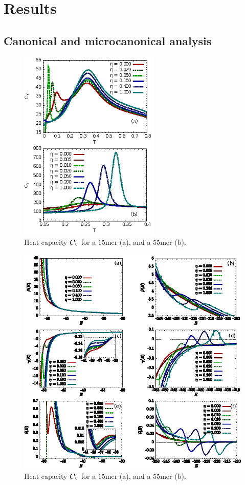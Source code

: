 \documentclass[12pt]{report}
\begin{document}
\section{Results}
%
\subsection{Canonical and microcanonical analysis}
\begin{figure}
\center
    \includegraphics[width=0.6\textwidth]{chapter6Figs/canonicalAnalysisRough.eps}%
    \caption{\label{canonicalAnalysis}
	Heat capacity $C_{\rm v}$ for a $15$mer (a), and a $55$mer (b).}
\end{figure}
%
\begin{figure}
\center
    \includegraphics[width=1.0\textwidth]{chapter6Figs/microcanonicalAnalysis.eps}%
    \caption{\label{microcanonicalAnalysis}
	Heat capacity $C_{\rm v}$ for a $15$mer (a), and a $55$mer (b).}
\end{figure}
%
\end{document}
